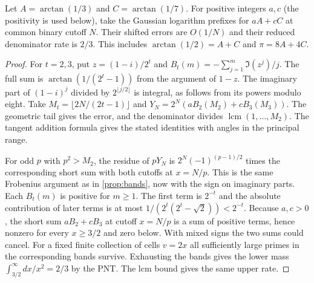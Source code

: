 \documentclass[11pt]{article}
\DeclareMathOperator{\lcm}{lcm}
\begin{document}
\begin{proposition}\label{prop:angles}
Let $A=\arctan(1/3)$ and $C=\arctan(1/7)$. For positive integers $a,c$ (the positivity is used below), take the Gaussian logarithm prefixes for $aA+cC$ at common binary cutoff $N$. Their shifted errors are $O(1/N)$ and their reduced denominator rate is $2/3$. This includes $\arctan(1/2)=A+C$ and $\pi=8A+4C$.
\end{proposition}
\begin{proof}
For $t=2,3$, put $z=(1-i)/2^t$ and $B_t(m)=-\sum_{j=1}^m\Im(z^j)/j$. The full sum is $\arctan(1/(2^t-1))$ from the argument of $1-z$. The imaginary part of $(1-i)^j$ divided by $2^{\lfloor j/2\rfloor}$ is integral, as follows from its powers modulo eight. Take $M_t=\lfloor2N/(2t-1)\rfloor$ and
$Y_N=2^N(aB_2(M_2)+cB_3(M_3))$. The geometric tail gives the error, and the denominator divides $\lcm(1,\ldots,M_2)$. The tangent addition formula gives the stated identities with angles in the principal range.

For odd $p$ with $p^2>M_2$, the residue of $pY_N$ is $2^N(-1)^{(p-1)/2}$ times the corresponding short sum with both cutoffs at $x=N/p$. This is the same Frobenius argument as in \cref{prop:bands}, now with the sign on imaginary parts. Each $B_t(m)$ is positive for $m\ge1$. The first term is $2^{-t}$ and the absolute contribution of later terms is at most $1/(2^t(2^t-\sqrt2))<2^{-t}$. Because $a,c>0$, the short sum $aB_2+cB_3$ at cutoff $x=N/p$ is a sum of positive terms, hence nonzero for every $x\ge3/2$ and zero below. With mixed signs the two sums could cancel. For a fixed finite collection of cells $v=2x$ all sufficiently large primes in the corresponding bands survive. Exhausting the bands gives the lower mass $\int_{3/2}^\infty dx/x^2=2/3$ by the PNT. The lcm bound gives the same upper rate.
\end{proof}
\end{document}
